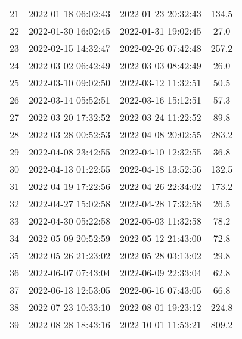 \begin{center}
\begin{longtable}{|c|c|c|c|}
21 & 2022-01-18 06:02:43 & 2022-01-23 20:32:43 & 134.5\\ 
22 & 2022-01-30 16:02:45 & 2022-01-31 19:02:45 & 27.0\\ 
23 & 2022-02-15 14:32:47 & 2022-02-26 07:42:48 & 257.2\\ 
24 & 2022-03-02 06:42:49 & 2022-03-03 08:42:49 & 26.0\\ 
25 & 2022-03-10 09:02:50 & 2022-03-12 11:32:51 & 50.5\\ 
26 & 2022-03-14 05:52:51 & 2022-03-16 15:12:51 & 57.3\\ 
27 & 2022-03-20 17:32:52 & 2022-03-24 11:22:52 & 89.8\\ 
28 & 2022-03-28 00:52:53 & 2022-04-08 20:02:55 & 283.2\\ 
29 & 2022-04-08 23:42:55 & 2022-04-10 12:32:55 & 36.8\\ 
30 & 2022-04-13 01:22:55 & 2022-04-18 13:52:56 & 132.5\\ 
31 & 2022-04-19 17:22:56 & 2022-04-26 22:34:02 & 173.2\\ 
32 & 2022-04-27 15:02:58 & 2022-04-28 17:32:58 & 26.5\\ 
33 & 2022-04-30 05:22:58 & 2022-05-03 11:32:58 & 78.2\\ 
34 & 2022-05-09 20:52:59 & 2022-05-12 21:43:00 & 72.8\\ 
35 & 2022-05-26 21:23:02 & 2022-05-28 03:13:02 & 29.8\\ 
36 & 2022-06-07 07:43:04 & 2022-06-09 22:33:04 & 62.8\\ 
37 & 2022-06-13 12:53:05 & 2022-06-16 07:43:05 & 66.8\\ 
38 & 2022-07-23 10:33:10 & 2022-08-01 19:23:12 & 224.8\\ 
39 & 2022-08-28 18:43:16 & 2022-10-01 11:53:21 & 809.2\\ 
\hline
\end{longtable}
\end{center}


